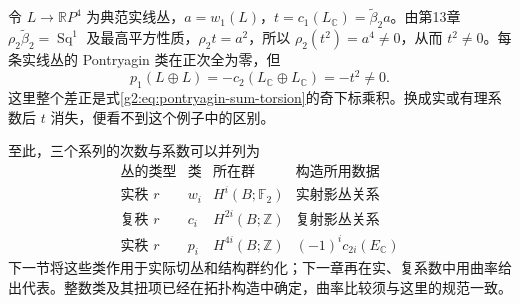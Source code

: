 \begin{example}\label{g2:exm:pontryagin-whitney-torsion}
	令 \(L\to\mathbb RP^4\) 为典范实线丛，\(a=w_1(L)\)，\(t=c_1(L_{\mathbb C})=\widetilde\beta_2a\)。由第13章 \(\rho_2\widetilde\beta_2=\operatorname{Sq}^1\) 及最高平方性质，\(\rho_2t=a^2\)，所以 \(\rho_2(t^2)=a^4\ne0\)，从而 \(t^2\ne0\)。每条实线丛的 Pontryagin 类在正次全为零，但
	\[
		p_1(L\oplus L)=-c_2(L_{\mathbb C}\oplus L_{\mathbb C})=-t^2\ne0.
	\]
	这里整个差正是式\eqref{g2:eq:pontryagin-sum-torsion}的奇下标乘积。换成实或有理系数后 \(t\) 消失，便看不到这个例子中的区别。
\end{example}

至此，三个系列的次数与系数可以并列为
\[
\begin{array}{c|c|c|c}
	\text{丛的类型}&\text{类}&\text{所在群}&\text{构造所用数据}\\\hline
	\text{实秩 }r&w_i&H^i(B;\mathbb F_2)&\text{实射影丛关系}\\
	\text{复秩 }r&c_i&H^{2i}(B;\mathbb Z)&\text{复射影丛关系}\\
	\text{实秩 }r&p_i&H^{4i}(B;\mathbb Z)&(-1)^ic_{2i}(E_{\mathbb C})
\end{array}
\]
下一节将这些类作用于实际切丛和结构群约化；下一章再在实、复系数中用曲率给出代表。整数类及其扭项已经在拓扑构造中确定，曲率比较须与这里的规范一致。
